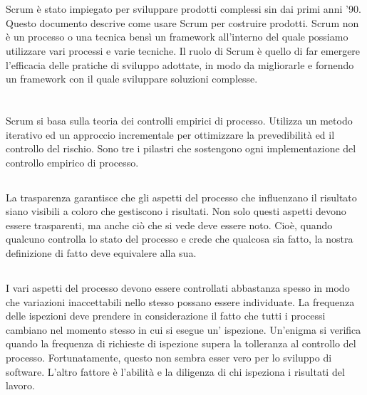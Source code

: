\newpage
\section*{\color{Blue}{LO SCOPO}}
\label{sec:purpose}
Scrum  \`e  stato  impiegato  per  sviluppare   prodotti
complessi sin dai  primi anni '90.  Questo documento descrive  come usare Scrum
per costruire prodotti.
Scrum non \`e un processo o una tecnica bens\`i un  framework all'interno del quale  possiamo utilizzare
vari processi e varie tecniche. Il ruolo di Scrum \`e quello di far emergere l'efficacia
delle  pratiche di  sviluppo adottate,  in modo  da migliorarle  e fornendo  un
framework con il quale sviluppare soluzioni complesse.

\section*{\color{Blue}{LA TEORIA  DI SCRUM}}
\label{sec:scrum_theory}
Scrum si basa sulla teoria dei controlli empirici di processo. Utilizza un
metodo iterativo ed un  approccio incrementale per ottimizzare la prevedibilit\`a
ed  il  controllo  del  rischio.  Sono  tre  i  pilastri  che  sostengono   ogni
implementazione  del  controllo empirico  di  processo.

\subsection*{\color{Blue}{LA PRIMA  TAPPA  \`E LA TRASPARENZA}}
\label{sec:transparency}
La  trasparenza  garantisce  che   gli  aspetti  del  processo   che
influenzano il risultato siano visibili a coloro che gestiscono i risultati. Non
solo questi aspetti  devono essere trasparenti,  ma anche ci\`o  che si vede  deve
essere noto.  Cio\`e, quando  qualcuno controlla  lo stato  del processo e crede che
qualcosa sia fatto, la nostra definizione di fatto deve equivalere alla sua.

\subsection*{\color{Blue}{LA  SECONDA  TAPPA \`E  L'ISPEZIONE}}
\label{sec:inspection}
I  vari aspetti  del  processo devono essere controllati abbastanza spesso  in modo che  variazioni 
inaccettabili nello stesso possano essere individuate. La frequenza delle ispezioni deve  prendere
in considerazione  il fatto  che tutti  i processi cambiano nel momento stesso in cui si esegue un'
ispezione. Un'enigma si verifica  quando la frequenza di richieste  di ispezione
supera  la  tolleranza al  controllo  del processo.  Fortunatamente,  questo non
sembra  esser vero per lo sviluppo di software. L'altro  fattore \`e l'abilit\`a e la
diligenza di chi ispeziona i risultati del lavoro.


